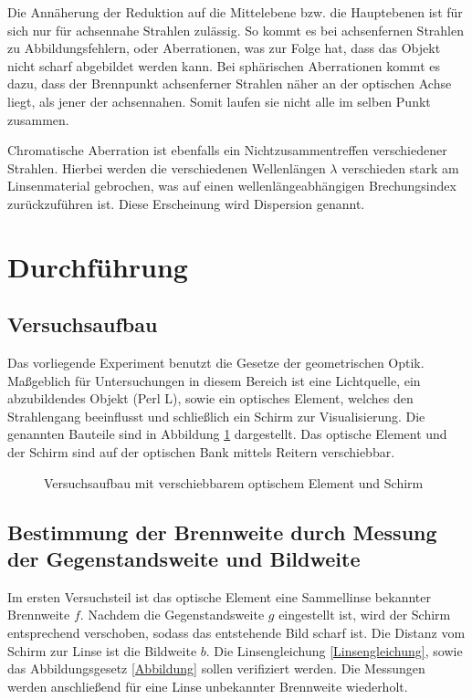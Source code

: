 Die Annäherung der Reduktion auf die Mittelebene bzw. die Hauptebenen ist für sich nur für achsennahe Strahlen zulässig. So kommt
es bei achsenfernen Strahlen zu Abbildungsfehlern, oder Aberrationen, was zur Folge hat, dass das Objekt nicht scharf abgebildet
werden kann. Bei sphärischen Aberrationen kommt es dazu, dass der Brennpunkt achsenferner Strahlen näher an der optischen Achse liegt,
als jener der achsennahen. Somit laufen sie nicht alle im selben Punkt zusammen. 

Chromatische Aberration ist ebenfalls ein Nichtzusammentreffen verschiedener Strahlen. Hierbei werden die verschiedenen Wellenlängen
$\lambda$ verschieden stark am Linsenmaterial gebrochen, was auf einen wellenlängeabhängigen Brechungsindex zurückzuführen ist. Diese
Erscheinung wird Dispersion genannt.

\section{Durchführung}
\subsection{Versuchsaufbau}
Das vorliegende Experiment benutzt die Gesetze der geometrischen Optik. Maßgeblich für Untersuchungen in diesem Bereich ist eine Lichtquelle,
ein abzubildendes Objekt (Perl L), sowie ein optisches Element, welches den Strahlengang beeinflusst und schließlich ein Schirm zur
Visualisierung. Die genannten Bauteile sind in Abbildung \ref{aufbau} dargestellt. Das optische Element und der Schirm sind auf der optischen
Bank mittels Reitern verschiebbar.

\begin{figure}[H]

\caption{Versuchsaufbau mit verschiebbarem optischem Element und Schirm}
\label{aufbau}
\end{figure}

\subsection[Messung von Gegenstandsweite und Bildweite]{Bestimmung der Brennweite durch Messung der Gegenstandsweite und Bildweite}
Im ersten Versuchsteil ist das optische Element eine Sammellinse bekannter Brennweite $f$. Nachdem die Gegenstandsweite $g$ eingestellt ist,
wird der Schirm entsprechend verschoben, sodass das entstehende Bild scharf ist. Die Distanz vom Schirm zur Linse ist die Bildweite $b$.
Die Linsengleichung \eqref{Linsengleichung}, sowie das Abbildungsgesetz \eqref{Abbildung} sollen verifiziert werden. Die Messungen werden anschließend für eine Linse unbekannter Brennweite
wiederholt.

